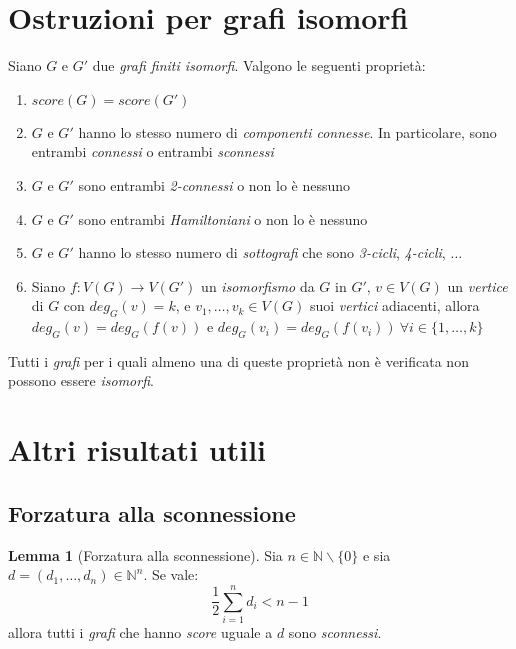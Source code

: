 \documentclass[12pt, a4paper]{report}
\newcommand{\N}{\mathbb{N}}
\theoremstyle{definition}
\newtheorem{lemma}{Lemma}[section]
\begin{document}
\section{Ostruzioni per grafi isomorfi}
Siano $G$ e $G'$ due \emph{grafi finiti isomorfi}. Valgono le seguenti proprietà:
\begin{enumerate}
    \item $score(G)=score(G')$
    \item $G$ e $G'$ hanno lo stesso numero di \emph{componenti connesse}. In
    particolare, sono entrambi \emph{connessi} o entrambi \emph{sconnessi}
    \item $G$ e $G'$ sono entrambi \emph{2-connessi} o non lo è nessuno
    \item $G$ e $G'$ sono entrambi \emph{Hamiltoniani} o non lo è nessuno
    \item $G$ e $G'$ hanno lo stesso numero di \emph{sottografi} che sono
    \emph{3-cicli}, \emph{4-cicli}, $\dots$
    \item Siano $f:V(G)\to V(G')$ un \emph{isomorfismo} da $G$ in $G'$, $v\in V(G)$
    un \emph{vertice} di $G$ con $deg_G(v)=k$, e $v_1,\dots,v_k\in V(G)$ suoi
    \emph{vertici} adiacenti, allora $deg_G(v)=deg_G(f(v))$ e
    $deg_G(v_i)=deg_G(f(v_i))\ \forall i\in\{1,\dots,k\}$
\end{enumerate}
Tutti i \emph{grafi} per i quali almeno una di queste proprietà non è verificata
non possono essere \emph{isomorfi}.

\section{Altri risultati utili}
\subsection{Forzatura alla sconnessione}
\begin{lemma}[Forzatura alla sconnessione]
    Sia $n\in\N\backslash\{0\}$ e sia $d=(d_1,\dots,d_n)\in\N^n$. Se vale:
    \begin{equation} \label{eq:F-S}\tag{F-S}
        \frac{1}{2}\sum_{i=1}^nd_i<n-1
    \end{equation}
    allora tutti i \emph{grafi} che hanno \emph{score} uguale a $d$ sono
    \emph{sconnessi}.
\end{lemma}
\end{document}
